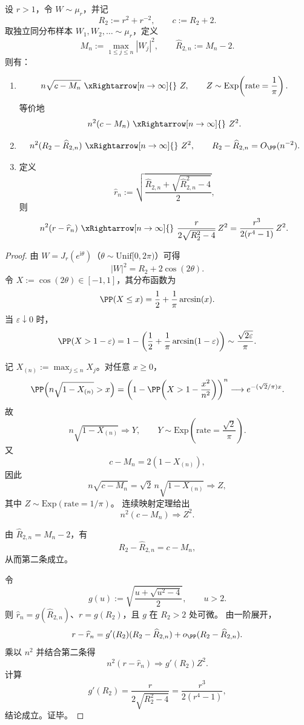 \begin{conclusion}\label{con:conclusion-coherent-reading-extreme-n2}
设 \(r>1\)，令 \(W\sim\mu_r\)，并记
\[
R_2:=r^2+r^{-2},\qquad c:=R_2+2.
\]
取独立同分布样本 \(W_1,W_2,\dots\sim\mu_r\)，定义
\[
M_n:=\max_{1\le j\le n}|W_j|^2,\qquad \widehat R_{2,n}:=M_n-2.
\]
则有：
\begin{enumerate}
  \item
  \[
  n\sqrt{c-M_n}\ \xRightarrow[n\to\infty]{}\ Z,\qquad
  Z\sim\mathrm{Exp}\!\left(\text{rate}=\frac{1}{\pi}\right).
  \]
  等价地
  \[
  n^2(c-M_n)\ \xRightarrow[n\to\infty]{}\ Z^2.
  \]
  \item
  \[
  n^2(R_2-\widehat R_{2,n})\ \xRightarrow[n\to\infty]{}\ Z^2,
  \qquad
  R_2-\widehat R_{2,n}=O_{\PP}(n^{-2}).
  \]
  \item 定义
  \[
  \widehat r_n:=\sqrt{\frac{\widehat R_{2,n}+\sqrt{\widehat R_{2,n}^2-4}}{2}},
  \]
  则
  \[
  n^2(r-\widehat r_n)\ \xRightarrow[n\to\infty]{}\ 
  \frac{r}{2\sqrt{R_2^2-4}}\,Z^2
  =
  \frac{r^3}{2(r^4-1)}\,Z^2.
  \]
\end{enumerate}
\end{conclusion}
\begin{proof}
由 \(W=J_r(e^{\mathrm{i}\theta})\)（\(\theta\sim\mathrm{Unif}[0,2\pi)\)）可得
\[
|W|^2=R_2+2\cos(2\theta).
\]
令 \(X:=\cos(2\theta)\in[-1,1]\)，其分布函数为
\[
\PP(X\le x)=\frac12+\frac1\pi\arcsin(x).
\]
当 \(\varepsilon\downarrow 0\) 时，
\[
\PP(X>1-\varepsilon)
=1-\left(\frac12+\frac1\pi\arcsin(1-\varepsilon)\right)
\sim \frac{\sqrt{2\varepsilon}}{\pi}.
\]

记 \(X_{(n)}:=\max_{j\le n}X_j\)。对任意 \(x\ge 0\)，
\[
\PP\!\left(n\sqrt{1-X_{(n)}}>x\right)
=\left(1-\PP\!\left(X>1-\frac{x^2}{n^2}\right)\right)^n
\longrightarrow e^{-(\sqrt2/\pi)x}.
\]
故
\[
n\sqrt{1-X_{(n)}}\Rightarrow Y,\qquad
Y\sim\mathrm{Exp}\!\left(\text{rate}=\frac{\sqrt2}{\pi}\right).
\]
又
\[
c-M_n=2(1-X_{(n)}),
\]
因此
\[
n\sqrt{c-M_n}=\sqrt2\,n\sqrt{1-X_{(n)}}\Rightarrow Z,
\]
其中 \(Z\sim\mathrm{Exp}(\text{rate}=1/\pi)\)。
连续映射定理给出
\[
n^2(c-M_n)\Rightarrow Z^2.
\]

由 \(\widehat R_{2,n}=M_n-2\)，有
\[
R_2-\widehat R_{2,n}=c-M_n,
\]
从而第二条成立。

令
\[
g(u):=\sqrt{\frac{u+\sqrt{u^2-4}}{2}},\qquad u>2.
\]
则 \(\widehat r_n=g(\widehat R_{2,n})\)、\(r=g(R_2)\)，且 \(g\) 在 \(R_2>2\) 处可微。
由一阶展开，
\[
r-\widehat r_n
=g'(R_2)(R_2-\widehat R_{2,n})+o_{\PP}(R_2-\widehat R_{2,n}).
\]
乘以 \(n^2\) 并结合第二条得
\[
n^2(r-\widehat r_n)\Rightarrow g'(R_2)Z^2.
\]
计算
\[
g'(R_2)=\frac{r}{2\sqrt{R_2^2-4}}
=\frac{r^3}{2(r^4-1)},
\]
结论成立。证毕。
\end{proof}

